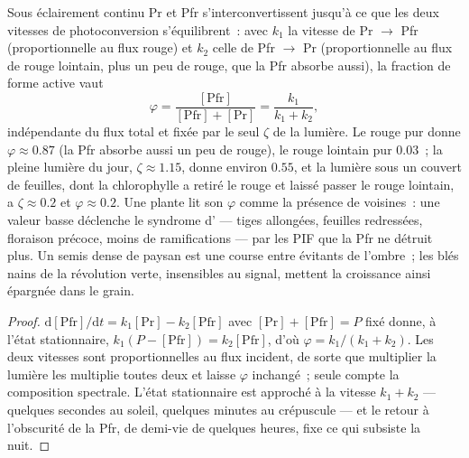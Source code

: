 \begin{proposition}\label{prop:b3:plant-molecular-physiology:photoequilibrium}
Sous éclairement continu Pr et Pfr s'interconvertissent jusqu'à ce que
les deux vitesses de photoconversion s'équilibrent~: avec $k_{1}$ la
vitesse de Pr $\to$ Pfr (proportionnelle au flux rouge) et $k_{2}$
celle de Pfr $\to$ Pr (proportionnelle au flux de rouge lointain, plus
un peu de rouge, que la Pfr absorbe aussi), la fraction de forme active
vaut
\[
\varphi = \frac{[\text{Pfr}]}{[\text{Pfr}] + [\text{Pr}]} = \frac{k_{1}}{k_{1} + k_{2}},
\]
indépendante du flux total et fixée par le seul \emph{} $\zeta$ de la lumière. Le rouge pur donne
$\varphi \approx 0.87$ (la Pfr absorbe aussi un peu de rouge), le rouge
lointain pur $0.03$~; la pleine lumière du jour, $\zeta \approx
1.15$, donne environ $0.55$, et la lumière sous un couvert de feuilles,
dont la chlorophylle a retiré le rouge et laissé passer le rouge
lointain, a $\zeta \approx 0.2$ et $\varphi \approx 0.2$. Une plante lit
son $\varphi$ comme la présence de voisines~: une valeur basse déclenche
le syndrome d'\emph{} --- tiges allongées, feuilles
redressées, floraison précoce, moins de ramifications --- par les PIF
que la Pfr ne détruit plus. Un semis dense de paysan est une course
entre évitants de l'ombre~; les blés nains de la révolution verte,
insensibles au signal, mettent la croissance ainsi épargnée dans le
grain.
\end{proposition}
\begin{proof}
$\mathrm{d}[\text{Pfr}]/\mathrm{d}t = k_{1}[\text{Pr}] - k_{2}[\text{Pfr}]$
avec $[\text{Pr}] + [\text{Pfr}] = P$ fixé donne, à l'état stationnaire,
$k_{1}(P - [\text{Pfr}]) = k_{2}[\text{Pfr}]$, d'où $\varphi = k_{1}/
(k_{1} + k_{2})$. Les deux vitesses sont proportionnelles au flux
incident, de sorte que multiplier la lumière les multiplie toutes deux
et laisse $\varphi$ inchangé~; seule compte la composition spectrale.
L'état stationnaire est approché à la vitesse $k_{1} + k_{2}$ ---
quelques secondes au soleil, quelques minutes au crépuscule --- et le
retour à l'obscurité de la Pfr, de demi-vie de quelques heures, fixe ce
qui subsiste la nuit.
\end{proof}


